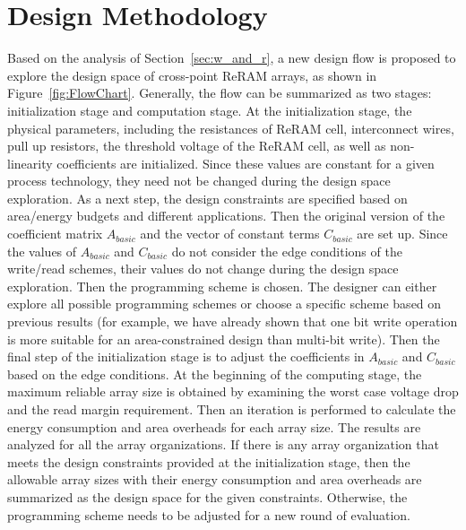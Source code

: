 \vspace{10pt}
\section{Design Methodology}\label{sec:framwork}
Based on the analysis of Section~\ref{sec:w_and_r}, a new design flow is proposed to explore the design space of cross-point ReRAM arrays, as shown in Figure~\ref{fig:FlowChart}. Generally, the flow can be summarized as two stages: initialization stage and computation stage. At the initialization stage, the physical parameters, including the resistances of ReRAM cell, interconnect wires, pull up resistors, the threshold voltage of the ReRAM cell, as well as non-linearity coefficients are initialized. Since these values are constant for a given process technology, they need not be changed during the design space exploration. As a next step, the design constraints are specified based on area/energy budgets and different applications. Then the  original version of the coefficient matrix $A_{basic}$ and the vector of constant terms $C_{basic}$ are set up. Since the values of $A_{basic}$ and $C_{basic}$ do not consider the edge conditions of the write/read schemes, their values do not change during the design space exploration. Then the programming scheme is chosen. The designer can either explore all possible programming schemes or choose a specific scheme based on previous results (for example, we have already shown that one bit write operation is more suitable for an area-constrained design than multi-bit write). Then the final step of the initialization stage is to adjust the coefficients in $A_{basic}$ and $C_{basic}$ based on the edge conditions. At the beginning of the computing stage, the maximum reliable array size is obtained by examining the worst case voltage drop and the read margin requirement. Then an iteration is performed to calculate the energy consumption and area overheads for each array size. The results are analyzed for all the array organizations. If there is any array organization that meets the design constraints provided at  the initialization stage, then the allowable array sizes with their energy consumption and area overheads are summarized as the design space for the given constraints. Otherwise, the programming scheme needs to be adjusted for a new round of evaluation.



